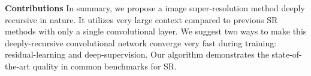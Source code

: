 \documentclass[10pt,twocolumn,letterpaper]{article}
\begin{document}
%
%
%

\textbf{Contributions} In summary, we propose a image super-resolution method deeply recursive in nature. It utilizes very large context compared to previous SR methods with only a single convolutional layer. We suggest two ways to make this deeply-recursive convolutional network converge very fast during training: residual-learning and deep-supervision. Our algorithm demonstrates the state-of-the-art quality in common benchmarks for SR.


\end{document}
